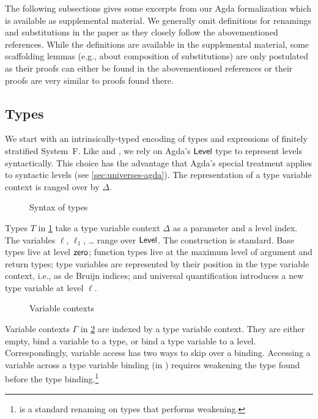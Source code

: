 \documentclass[manuscript,screen,review,anonymous]{acmart}
\begin{document}
The following subsections gives some excerpts from our Agda
formalization which is available as supplemental material. We
generally omit definitions for renamings and substitutions in the
paper as they closely follow the abovementioned references. While the
definitions are available in the supplemental material, some
scaffolding lemmas (e.g., about composition of substitutions) are only
postulated as their proofs can either be found in the abovementioned
references or their proofs are very similar to proofs found there. 

\subsection{Types}
\label{sec:syntax-types}

We start with an intrinsically-typed encoding of types and expressions
of finitely stratified System~F. Like
\citet{DBLP:conf/tyde/Saffrich0W24} and
\citet{DBLP:journals/pacmpl/HubersM23}, we rely on Agda's $\ALevel$
type to represent levels syntactically. This choice has the advantage
that Agda's special treatment applies to syntactic levels (see
\ref{sec:universes-agda}). The representation of a type variable
context is {\SFTEnv} ranged over by $\Delta$.

\begin{figure}[tp]
  \SFType
  \caption{Syntax of types}
  \label{fig:native-type-syntax}
\end{figure}
Types $T$ in \cref{fig:native-type-syntax} take a type variable
context $\Delta$ as a parameter and a level 
index. The variables $\ell$, $\ell_1$, \dots{} range over
$\ALevel$. The construction is standard. Base types live at level
$\ASetzero$; function types live at the maximum level of argument and
return types; type variables are
represented by their position in the type variable context, i.e.,
as de Bruijn indices; and
universal quantification introduces a new type variable at level $\ell$.

\begin{figure}[tp]
  \begin{minipage}{0.45\linewidth}
    \SFEEnv
  \end{minipage}
  \begin{minipage}{0.45\linewidth}
    \SFEEnvNi
  \end{minipage}
  \caption{Variable contexts}
  \label{fig:native-variable-contexts}
\end{figure}
Variable contexts $\Gamma$ in \cref{fig:native-variable-contexts} are indexed by a type variable context. They
are either empty, bind a variable to a type, or bind a type variable
to a level. Correspondingly, variable access \AgdaDatatype{$\_\ni\_$} has two ways to
skip over a binding. Accessing a variable across a type variable
binding (in \Atskip) requires weakening the type found before the type
binding.\footnote{{\ATwk} is a standard renaming on types that
  performs weakening.}
\end{document}
